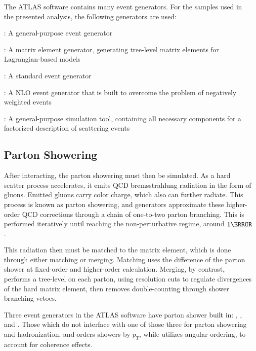 The ATLAS software contains many event generators. For the samples used in the presented analysis, the following generators are used:

\begin{description}
    \item \HERWIGpp: A general-purpose event generator \cite{herwigpp}
    \item \MADGRAPH: A matrix element generator, generating tree-level matrix elements for Lagrangian-based models \cite{mg5}
    \item \PYTHIA: A standard event generator \cite{pythia8.2}
    \item \POWHEG: A \gls{NLO} event generator that is built to overcome the problem of negatively weighted events \cite{powheg} %
    \item \SHERPA: A general-purpose simulation tool, containing all necessary components for a factorized description of scattering events \cite{sherpa2.2}
\end{description}

\subsection{Parton Showering} \label{ssec:partonshower} %
After interacting, the parton showering must then be simulated. As a hard scatter process accelerates, it emits \gls{QCD} bremsstrahlung radiation in the form of gluons. Emitted gluons carry color charge, which also can further radiate. This process is known as parton showering, and generators approximate these higher-order \gls{QCD} corrections through a chain of one-to-two parton branching. This is performed iteratively until reaching the non-perturbative regime, around $\unit{1}{\GeV}$.

This radiation then must be matched to the matrix element, which is done through either matching or merging. Matching uses the difference of the parton shower at fixed-order and higher-order calculation. Merging, by contrast, performs a tree-level on each parton, using resolution cuts to regulate divergences of the hard matrix element, then removes double-counting through shower branching vetoes.

Three event generators in the ATLAS software have parton shower built in: \PYTHIA, \HERWIG, and \SHERPA. Those which do not interface with one of those three for parton showering and hadronization. \PYTHIA and \SHERPA orders showers by $p_{T}$, while \HERWIG utilizes angular ordering, to account for coherence effects. 

